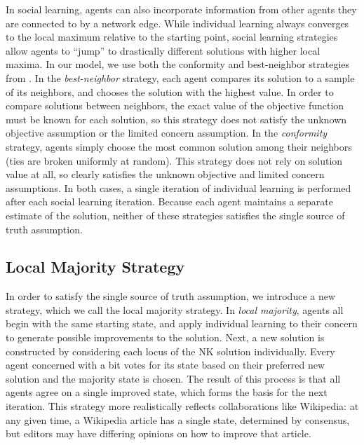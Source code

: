 In social learning,
agents can also incorporate information from
other agents they are connected to by a network edge.
While individual learning always converges to the local maximum relative to the starting point,
social learning strategies allow agents to ``jump'' to drastically different solutions with higher local maxima.
In our model, we use both the conformity and best-neighbor strategies from \cite{barkoczi_social_2016}.
In the {\em best-neighbor} strategy, each agent compares its solution to a sample of its
neighbors, and chooses the solution with the highest value.
In order to compare solutions between neighbors,
the exact value of the objective function must be known for each solution,
so this strategy does not satisfy the unknown objective assumption
or the limited concern assumption.
In the {\em conformity} strategy, agents simply choose the most common solution among their neighbors
(ties are broken uniformly at random).
This strategy does not rely on solution value at all, so clearly satisfies the
unknown objective and limited concern assumptions.
In both cases, a single iteration of individual learning is performed after each social learning
iteration.
Because each agent maintains a separate estimate of the solution,
neither of these strategies satisfies the single source of truth assumption.

\subsection{Local Majority Strategy}

In order to satisfy the single source of truth assumption,
we introduce a new strategy, which we call the local majority strategy.
In {\em local majority}, agents all begin with the same starting state,
and apply individual learning to their concern to generate
possible improvements to the solution.
Next, a new solution is constructed by considering each locus of the NK solution
individually.
Every agent concerned with a bit votes for its state based on their preferred
new solution and the majority state is chosen.
The result of this process is that all agents agree on a single improved state,
which forms the basis for the next iteration.
This strategy more realistically reflects collaborations like Wikipedia:
at any given time, a Wikipedia article has a single state, determined by consensus,
but editors may have differing opinions on how to improve that article.

